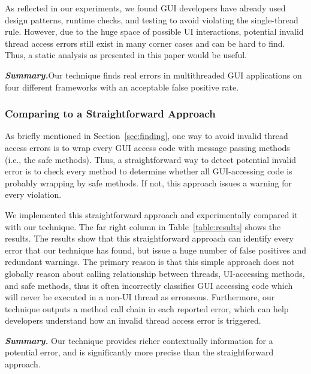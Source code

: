 As reflected in our experiments, we found GUI developers have already
used design patterns, runtime checks, and testing to avoid violating
the single-thread rule. However, due to the huge space of
possible UI interactions, potential
invalid thread access errors still exist in many corner cases and
can be hard to find. Thus, a static analysis as presented in this paper
would be useful.

\vspace{1mm}

\noindent \textbf{\textit{Summary.}}Our technique finds real errors
in multithreaded GUI applications on four different frameworks with
an acceptable false positive rate.

\subsubsection{Comparing to a Straightforward Approach}
\label{sec:straightforward}

As briefly mentioned in Section~\ref{sec:finding}, one way to avoid
invalid thread access errors is to wrap every GUI access code
with message passing methods (i.e., the safe methods). Thus, a
straightforward way to detect potential invalid error
is to check every method to determine whether all GUI-accessing code
is probably wrapping by safe methods. If not, this approach
issues a warning for every violation. 

We implemented this straightforward approach and experimentally compared it
with our technique.%
The far right column in Table~\ref{table:results} shows the results.
The results show that this straightforward approach can identify every
error that our technique has found, but issue a huge number of false
positives and redundant warnings. The primary reason is that this simple approach
does not globally reason about calling relationship between
threads, UI-accessing methods, and safe methods, thus it often incorrectly
classifies GUI accessing code which will never be executed
in a non-UI thread as erroneous. Furthermore, our technique
outputs a method call chain in each reported error, which can help
developers understand how an invalid thread access error is triggered.



\vspace{1mm}

\noindent \textbf{\textit{Summary.}} Our technique provides
richer contextually information for a potential error, and 
is significantly more precise than the straightforward approach.


